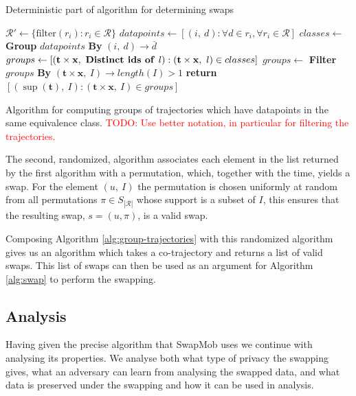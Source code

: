 \documentclass[12pt]{article}
\newcommand{\todo}[1]{\textcolor{red}{#1}}
\newcommand{\data}{d}
\newcommand{\traj}{r}
\newcommand{\cotraj}{\mathcal{R}}
\newcommand{\swap}{s}
\newcommand{\swaptime}{u}
\newcommand{\locint}{\mathbf{x}}
\newcommand{\timint}{\mathbf{t}}
\theoremstyle{definition}
\begin{document}
\begin{algorithm}
  \caption{Deterministic part of algorithm for determining swaps}
  \label{alg:group-trajectories}
  \begin{algorithmic}
    \Procedure{GroupTrajectories}{$\cotraj$}
    \State \(\cotraj' \gets \{\textrm{filter}(\traj_{i}): \traj_{i} \in \cotraj\}\)
    \State \(datapoints \gets [(i,\ \data): \forall \data \in \traj_{i},
    \forall \traj_{i} \in \cotraj]\)
    \State \(classes \gets\) \textbf{Group} \(datapoints\) \textbf{By}
    \((i,\ \data) \to \overline{\data}\)
    \State \(groups \gets [(\timint \times \locint,\ \text{\textbf{Distinct ids of }} l):
    (\timint \times \locint,\ l) \in classes]\)
    \State \(groups \gets\) \textbf{Filter} \(groups\) \textbf{By}
    \((\timint \times \locint,\ I) \to length(I) > 1\)
    \State \textbf{return} \([(\sup(\timint),\ I):
    (\timint \times \locint,\ I) \in groups]\)
    \EndProcedure
  \end{algorithmic}
  \caption{Algorithm for computing groups of trajectories which have
    datapoints in the same equivalence class. \todo{TODO: Use better
      notation, in particular for filtering the trajectories.}}
\end{algorithm}

The second, randomized, algorithm associates each element in the list
returned by the first algorithm with a permutation, which, together
with the time, yields a swap. For the element \((\swaptime,\ I)\) the
permutation is chosen uniformly at random from all permutations
\(\pi \in S_{|\cotraj|}\) whose support is a subset of \(I\), this
ensures that the resulting swap, \(\swap = (\swaptime, \pi)\), is a
valid swap.

Composing Algorithm \ref{alg:group-trajectories} with this randomized
algorithm gives us an algorithm which takes a co-trajectory and
returns a list of valid swaps. This list of swaps can then be used as
an argument for Algorithm \ref{alg:swap} to perform the swapping.

\subsection{Analysis}
\label{sec:swapmob-analysis}
Having given the precise algorithm that SwapMob uses we continue with
analysing its properties. We analyse both what type of privacy the
swapping gives, what an adversary can learn from analysing the swapped
data, and what data is preserved under the swapping and how it can be
used in analysis.
\end{document}
